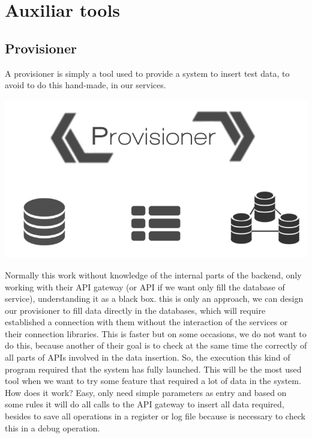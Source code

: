 \section{Auxiliar tools}


\subsection{Provisioner}
A provisioner is simply a tool used to provide a system to insert test data, to
avoid to do this hand-made, in our services.

\begin{center}
\includegraphics[scale=0.4]{img/graphics/provisioner.png}
\end{center}

\noindent Normally this work without knowledge
of the internal parts of the backend, only working with their API gateway (or
API if we want only fill the database of service), understanding it as a black box.
this is only an approach, we can design our provisioner to fill data directly
in the databases, which will require established a connection with them without
the interaction of the services or their connection libraries. This is faster but
on some occasions, we do not want to do this, because another of their goal is to
check at the same time the correctly of all parts of APIs involved in the data insertion.
\linebreak
\linebreak
\noindent So, the execution this kind of program required that the system has fully launched.
This will be the most used tool when we want to try some feature that required a
lot of data in the system.
\linebreak
\linebreak
\noindent How does it work? Easy, only need simple parameters as entry and based on some rules it will do all
calls to the API gateway to insert all data required, besides to save all operations
in a register or log file because is necessary to check this in a debug operation.
